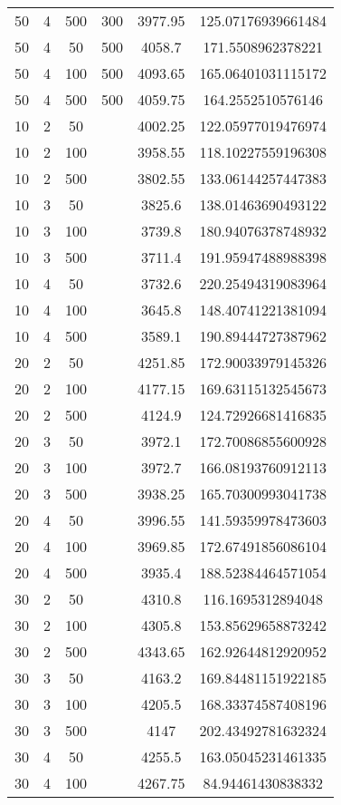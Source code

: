 {\begin{longtabu}{S
S
S
S
S[round-mode=places, round-precision=0]
S[round-mode=places, round-precision=0]}
50 & 4 & 500 & 300 & 3977.95 & 125.07176939661484 \\
50 & 4 & 50 & 500 & 4058.7 & 171.5508962378221 \\
50 & 4 & 100 & 500 & 4093.65 & 165.06401031115172 \\
50 & 4 & 500 & 500 & 4059.75 & 164.2552510576146 \\
10 & 2 & 50 & & 4002.25 & 122.05977019476974 \\
10 & 2 & 100 & & 3958.55 & 118.10227559196308 \\
10 & 2 & 500 & & 3802.55 & 133.06144257447383 \\
10 & 3 & 50 & & 3825.6 & 138.01463690493122 \\
10 & 3 & 100 & & 3739.8 & 180.94076378748932 \\
10 & 3 & 500 & & 3711.4 & 191.95947488988398 \\
10 & 4 & 50 & & 3732.6 & 220.25494319083964 \\
10 & 4 & 100 & & 3645.8 & 148.40741221381094 \\
10 & 4 & 500 & & 3589.1 & 190.89444727387962 \\
20 & 2 & 50 & & 4251.85 & 172.90033979145326 \\
20 & 2 & 100 & & 4177.15 & 169.63115132545673 \\
20 & 2 & 500 & & 4124.9 & 124.72926681416835 \\
20 & 3 & 50 & & 3972.1 & 172.70086855600928 \\
20 & 3 & 100 & & 3972.7 & 166.08193760912113 \\
20 & 3 & 500 & & 3938.25 & 165.70300993041738 \\
20 & 4 & 50 & & 3996.55 & 141.59359978473603 \\
20 & 4 & 100 & & 3969.85 & 172.67491856086104 \\
20 & 4 & 500 & & 3935.4 & 188.52384464571054 \\
30 & 2 & 50 & & 4310.8 & 116.1695312894048 \\
30 & 2 & 100 & & 4305.8 & 153.85629658873242 \\
30 & 2 & 500 & & 4343.65 & 162.92644812920952 \\
30 & 3 & 50 & & 4163.2 & 169.84481151922185 \\
30 & 3 & 100 & & 4205.5 & 168.33374587408196 \\
30 & 3 & 500 & & 4147 & 202.43492781632324 \\
30 & 4 & 50 & & 4255.5 & 163.05045231461335 \\
30 & 4 & 100 & & 4267.75 & 84.94461430838332 \\

\end{longtabu}}
